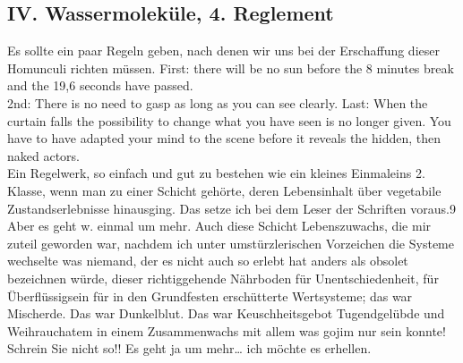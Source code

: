 \documentclass[
]{article}
\author{}
\date{\vspace{-2.5em}}
\begin{document}
\subsection{IV. Wassermoleküle, 4.
Reglement}\label{iv.-wassermolekuxfcle-4.-reglement}

Es sollte ein paar Regeln geben, nach denen wir uns bei der Erschaffung
dieser Homunculi richten müssen. First: there will be no sun before the
8 minutes break and the 19,6 seconds have passed.\\
2nd: There is no need to gasp as long as you can see clearly. Last: When
the curtain falls the possibility to change what you have seen is no
longer given. You have to have adapted your mind to the scene before it
reveals the hidden, then naked actors.\\
Ein Regelwerk, so einfach und gut zu bestehen wie ein kleines Einmaleins
2. Klasse, wenn man zu einer Schicht gehörte, deren Lebensinhalt über
vegetabile Zustandserlebnisse hinausging. Das setze ich bei dem Leser
der Schriften voraus.9\\
Aber es geht w. einmal um mehr. Auch diese Schicht Lebenszuwachs, die
mir zuteil geworden war, nachdem ich unter umstürzlerischen Vorzeichen
die Systeme wechselte was niemand, der es nicht auch so erlebt hat
anders als obsolet bezeichnen würde, dieser richtiggehende Nährboden für
Unentschiedenheit, für Überflüssigsein für in den Grundfesten
erschütterte Wertsysteme; das war Mischerde. Das war Dunkelblut. Das war
Keuschheitsgebot Tugendgelübde und Weihrauchatem in einem Zusammenwachs
mit allem was gojim nur sein konnte! Schrein Sie nicht so!! Es geht ja
um mehr\ldots{} ich möchte es erhellen.
\end{document}
